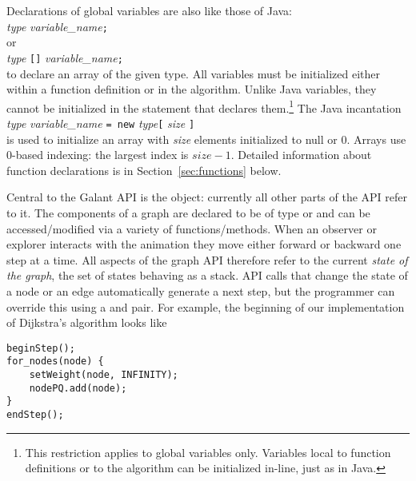 Declarations of global variables are also like those of Java:\\
\hspace*{1em}\emph{type} \emph{variable\_name}\texttt{;}\\
or\\
\hspace*{1em}\emph{type} \texttt{[]} \emph{variable\_name}\texttt{;}\\
to declare an array of the given type.
All variables must be initialized either within a function definition or
in the algorithm.
Unlike Java variables, they cannot be initialized in the statement that
declares them.\footnote{This restriction applies to global variables
  only. Variables local to function definitions or to the algorithm can be
  initialized in-line, just as in Java.
}
The Java incantation\\
\hspace*{1em}\emph{type} \emph{variable\_name}
\texttt{= new} \emph{type}\texttt{[} \emph{size} \texttt{]}\\
is used to initialize an array with \emph{size} elements initialized to \textsf{null}
or 0.
Arrays use 0-based indexing: the largest index is $\mathit{size} - 1$.
Detailed
information about function declarations is in Section~\ref{sec:functions}
below.

Central to the Galant API is the  object: currently all other
parts of the API refer to it.
The components of a graph are declared to be of type  or
 and can be accessed/modified via a variety of
functions/methods.
When an observer or explorer interacts with the animation they move either
forward or backward one step at a time.
All aspects of the graph API therefore refer to the current \emph{state of
  the graph}, the set of states behaving as a stack.
API calls that change the state of a node or an edge automatically
generate a next step,
but the programmer can override this using a  and
 pair. For example, the beginning of our implementation of
Dijkstra's algorithm looks like

\begin{center}
\begin{minipage}{0.5\textwidth}
\begin{verbatim}
beginStep();
for_nodes(node) {
    setWeight(node, INFINITY);
    nodePQ.add(node);
}
endStep();
\end{verbatim}
\end{minipage}
\end{center}

